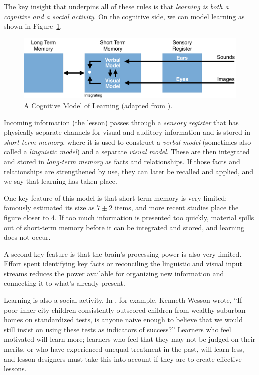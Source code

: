 \documentclass[10pt,letterpaper]{article}
\begin{document}
The key insight that underpins all of these rules is that \emph{learning is both
  a cognitive and a social activity}.  On the cognitive side, we can model
learning as shown in Figure~\ref{cognitive-model}.

\begin{figure}[ht]
\includegraphics[width=12cm]{cognitive-model.pdf}
\caption{A Cognitive Model of Learning (adapted from \cite{Maye2009}).}
\label{cognitive-model}
\end{figure}

Incoming information (the lesson) passes through a \emph{sensory register} that
has physically separate channels for visual and auditory information and is
stored in \emph{short-term memory}, where it is used to construct a \emph{verbal
  model} (sometimes also called a \emph{linguistic model}) and a separate
\emph{visual model}.  These are then integrated and stored in \emph{long-term
  memory} as facts and relationships.  If those facts and relationships are
strengthened by use, they can later be recalled and applied, and we say that
learning has taken place.

One key feature of this model is that short-term memory is very limited:
\cite{Mill1956} famously estimated its size as $7{\pm}2$ items, and more
recent studies place the figure closer to 4.  If too much information is
presented too quickly, material spills out of short-term memory before it can be
integrated and stored, and learning does not occur.

A second key feature is that the brain's processing power is also very limited.
Effort spent identifying key facts or reconciling the linguistic and visual
input streams reduces the power available for organizing new information and
connecting it to what's already present.

Learning is also a social activity.  In \cite{Litt2004}, for example, Kenneth
Wesson wrote, ``If poor inner-city children consistently outscored children from
wealthy suburban homes on standardized tests, is anyone naive enough to believe
that we would still insist on using these tests as indicators of success?''
Learners who feel motivated will learn more; learners who feel that they may
not be judged on their merits, or who have experienced unequal treatment in
the past, will learn less, and lesson designers must take this into account
if they are to create effective lessons.
\end{document}
